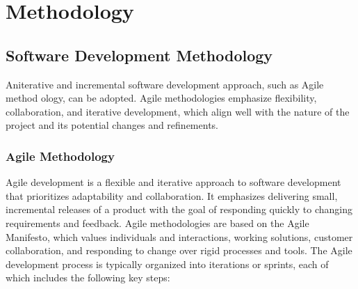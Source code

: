 \chapter{Methodology}
\section{Software Development Methodology}
Aniterative and incremental software development approach, such as Agile method
ology, can be adopted. Agile methodologies emphasize flexibility, collaboration,
and iterative development, which align well with the nature of the project and its
potential changes and refinements.
\subsection{Agile Methodology}
Agile development is a flexible and iterative approach to software development that prioritizes adaptability and collaboration. It emphasizes delivering small, incremental releases of a product with the goal of responding quickly to changing requirements and feedback. Agile methodologies are based on the Agile Manifesto, which values individuals and interactions, working solutions, customer collaboration, and responding to change over rigid processes and tools.
The Agile development process is typically organized into iterations or sprints, each of which includes the following key steps:\\
